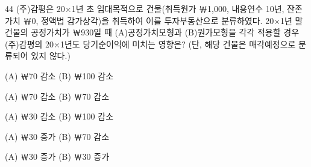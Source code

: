\begin{question}{44}
(주)감평은 20×1년 초 임대목적으로 건물(취득원가 ￦1,000, 내용연수 10년, 잔존가치 ￦0, 정액법 감가상각)을 취득하여 이를 투자부동산으로 분류하였다. 20×1년 말 건물의 공정가치가 ￦930일 때 (A)공정가치모형과 (B)원가모형을 각각 적용할 경우 (주)감평의 20×1년도 당기순이익에 미치는 영향은? (단, 해당 건물은 매각예정으로 분류되어 있지 않다.)
\begin{choices}
  \item (A) ￦70 감소 \quad (B) ￦100 감소
  \item (A) ￦70 감소 \quad (B) ￦70 감소
  \item (A) ￦30 감소 \quad (B) ￦100 감소
  \item (A) ￦30 증가 \quad (B) ￦70 감소
  \item (A) ￦30 증가 \quad (B) ￦30 증가
\end{choices}
\end{question}
